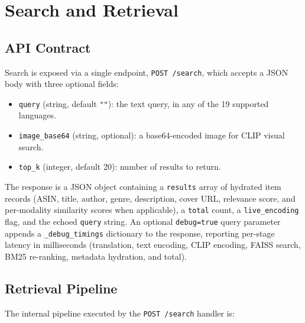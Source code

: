 \section{Search and Retrieval}
\label{sec:app_retrieval}

\subsection{API Contract}

Search is exposed via a single endpoint, \texttt{POST /search}, which accepts a JSON body with three optional fields:

\begin{itemize}
    \item \texttt{query} (string, default \texttt{""}): the text query, in any of the 19 supported languages.
    \item \texttt{image\_base64} (string, optional): a base64-encoded image for CLIP visual search.
    \item \texttt{top\_k} (integer, default 20): number of results to return.
\end{itemize}

The response is a JSON object containing a \texttt{results} array of hydrated item records (ASIN, title, author, genre, description, cover URL, relevance score, and per-modality similarity scores when applicable), a \texttt{total} count, a \texttt{live\_encoding} flag, and the echoed \texttt{query} string.
An optional \texttt{debug=true} query parameter appends a \texttt{\_debug\_timings} dictionary to the response, reporting per-stage latency in milliseconds (translation, text encoding, CLIP encoding, FAISS search, BM25 re-ranking, metadata hydration, and total).

\subsection{Retrieval Pipeline}

The internal pipeline executed by the \texttt{POST /search} handler is:

